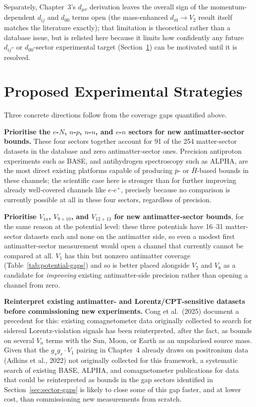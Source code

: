 \documentclass[main]{subfiles}
\begin{document}
Separately, Chapter~3's $d_{\mu\nu}$ derivation leaves the overall sign of
the momentum-dependent $d_{ij}$ and $d_{00}$ terms open (the mass-enhanced
$d_{i0}\to V_2$ result itself matches the literature exactly); that
limitation is theoretical rather than a database issue, but is relisted
here because it limits how confidently any future $d_{ij}$- or
$d_{00}$-sector experimental target (Section~\ref{sec:strategy}) can be
motivated until it is resolved.

\section{Proposed Experimental Strategies}
\label{sec:strategy}

Three concrete directions follow from the coverage gaps quantified above.

\textbf{Prioritise the $e$-$N$, $n$-$p$, $n$-$n$, and $e$-$n$ sectors for
new antimatter-sector bounds.} These four sectors together account for 91
of the 254 matter-sector datasets in the database and zero antimatter-sector
ones. Precision antiproton experiments such as BASE, and antihydrogen
spectroscopy such as ALPHA, are the most direct existing platforms capable
of producing $\bar p$- or $\bar H$-based bounds in these channels; the
scientific case here is stronger than for further improving already
well-covered channels like $e$-$e^+$, precisely because no comparison is
currently possible at all in these four sectors, regardless of precision.

\textbf{Prioritise $V_{1a}$, $V_{9+10}$, and $V_{12+13}$ for new
antimatter-sector bounds}, for the same reason at the potential level:
these three potentials have 16--31 matter-sector datasets each and none on
the antimatter side, so even a modest first antimatter-sector measurement
would open a channel that currently cannot be compared at all. $V_1$ has
thin but nonzero antimatter coverage (Table~\ref{tab:potential-gaps}) and
so is better placed alongside $V_2$ and $V_8$ as a candidate for
\emph{improving} existing antimatter-side precision rather than opening a
channel from zero.

\textbf{Reinterpret existing antimatter- and Lorentz/CPT-sensitive datasets
before commissioning new experiments.} Cong et al.\ (2025) document a
precedent for this: existing comagnetometer data originally collected to
search for sidereal Lorentz-violation signals has been reinterpreted, after
the fact, as bounds on several $V_n$ terms with the Sun, Moon, or Earth as
an unpolarised source mass. Given that the $g_sg_s\cdot V_1$ pairing in
Chapter~4 already draws on positronium data (Adkins et al., 2022) not
originally collected for this framework, a systematic search of existing BASE, ALPHA, and
comagnetometer publications for data that could be reinterpreted as bounds
in the gap sectors identified in Section~\ref{sec:sector-gaps} is likely to
close some of this gap faster, and at lower cost, than commissioning new
measurements from scratch.
\end{document}
